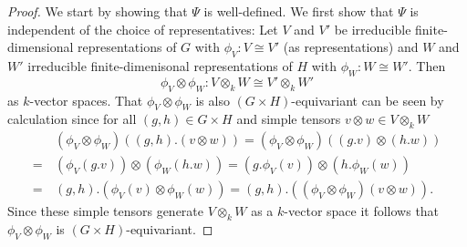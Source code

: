 \begin{proof}
  We start by showing that $\Psi$ is well-defined.
  We first show that $\Psi$ is independent of the choice of representatives:
  Let $V$ and $V'$ be irreducible finite-dimensional representations of $G$ with $\phi_V \colon V \cong V'$ (as representations) and $W$ and $W'$ irreducible finite-dimenisonal representations of $H$ with $\phi_W \colon W \cong W'$.
  Then
  \[
            \phi_V \otimes \phi_W
    \colon  V  \otimes_k W
    \cong   V' \otimes_k W'
  \]
  as $k$-vector spaces.
  That $\phi_V \otimes \phi_W$ is also $(G \times H)$-equivariant can be seen by calculation since for all $(g,h) \in G \times H$ and simple tensors $v \otimes w \in V \otimes_k W$
  \begin{align*}
     &\, (\phi_V \otimes \phi_W)((g,h).(v \otimes w))
    =    (\phi_V \otimes \phi_W)((g.v) \otimes (h.w)) \\
    =&\, (\phi_V(g.v)) \otimes (\phi_W(h.w))
    =    (g.\phi_V(v)) \otimes (h.\phi_W(w)) \\
    =&\, (g,h).(\phi_V(v) \otimes \phi_W(w))
    =    (g,h).((\phi_V \otimes \phi_W)(v \otimes w)).
  \end{align*}
  Since these simple tensors generate $V \otimes_k W$ as a $k$-vector space it follows that $\phi_V \otimes \phi_W$ is $(G \times H)$-equivariant.
  

\end{proof}
